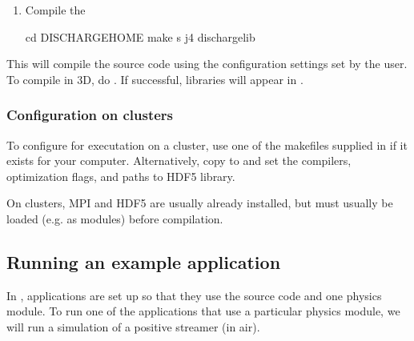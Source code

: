 \documentclass[letterpaper,10pt,english]{sphinxmanual}
\begin{document}
\begin{enumerate}
\begin{itemize}
\begin{sphinxVerbatim}[commandchars=\\\{\},formatcom=\scriptsize]
cp \PYGZdl{}DISCHARGE\PYGZus{}HOME/Local/Make.defs.MPI.HDF5.GNU \PYGZdl{}CHOMBO\PYGZus{}HOME/mk/Make.defs.local
\end{sphinxVerbatim}

\end{itemize}

\item {} 
Compile the 

\begin{sphinxVerbatim}[commandchars=\\\{\},formatcom=\scriptsize]
cd \PYGZdl{}DISCHARGE\PYGZus{}HOME
make \PYGZhy{}s \PYGZhy{}j4 discharge\PYGZhy{}lib
\end{sphinxVerbatim}

\end{enumerate}

This will compile the  source code using the configuration settings set by the user.
To compile  in 3D, do .
If successful,  libraries will appear in .


\subsubsection{Configuration on clusters}
\label{\detokenize{Base/GettingStarted:configuration-on-clusters}}
To configure  for executation on a cluster, use one of the makefiles supplied in  if it exists for your computer.
Alternatively, copy  to  and set the compilers, optimization flags, and paths to HDF5 library.

On clusters, MPI and HDF5 are usually already installed, but must usually be loaded (e.g. as modules) before compilation.


\subsection{Running an example application}
\label{\detokenize{Base/GettingStarted:running-an-example-application}}
In , applications are set up so that they use the  source code and one  physics module.
To run one of the applications that use a particular  physics module, we will run a simulation of a positive streamer (in air).
\end{document}
